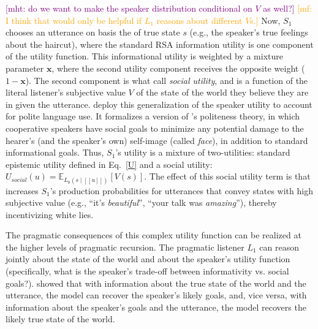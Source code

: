 \documentclass{sp}
\newcommand{\mf}[1]{\textcolor{orange}{[mf: #1]}}
\newcommand{\mht}[1]{\textcolor{purple}{[mht: #1]}}
\newcommand{\sem}[1]{\ensuremath{[\![#1]\!]}}
\begin{document}
\mht{do we want to make the speaker distribution conditional on $V$ as well?} \mf{I think that would only be helpful if $L_1$ reasons about different $V$s.}
Now, $S_1$ chooses an utterance on basis the of true state $s$ (e.g., the speaker's true feelings about the haircut), where the standard RSA information utility is one component of the utility function. 
This informational utility is weighted by a mixture parameter $\textbf{x}$, where the second utility component receives the opposite weight ($1-\textbf{x}$).
The second component is what \cite{yoonetal2016} call \emph{social utility}, and is a function of the literal listener's subjective value $V$ of the state of the world they believe they are in given the utterance.
\cite{yoonetal2016} deploy this generalization of the speaker utility to account for polite language use. 
It formalizes a version of \cite{brown1987politeness}'s politeness theory, in which cooperative speakers have social goals to minimize any potential damage to the hearer’s (and the speaker’s own) self-image (called \emph{face}), in addition to standard informational goals. 
Thus, $S_1$'s utility is a mixture of two-utilities: standard epistemic utility defined in Eq.~\ref{U} and a social utility: $U_{social}(u)  =  \mathbb{E}_{L_0(s \mid \sem{u})}[V(s)]$.
%
The effect of this social utility term is that increases $S_1$'s production probabilities for utterances that convey states with high subjective value (e.g., ``it's \emph{beautiful}'', ``your talk was \emph{amazing}''), thereby incentivizing white lies. 

The pragmatic consequences of this complex utility function can be realized at the higher levels of pragmatic recursion.
The pragmatic listener $L_1$ can reason jointly about the state of the world and about the speaker's utility function (specifically, what is the speaker's trade-off between informativity vs. social goals?). \cite{yoonetal2016} showed that with information about the true state of the world and the utterance, the model can recover the speaker's likely goals, and, vice versa, with information about the speaker's goals and the utterance, the model recovers the likely true state of the world.
\end{document}
